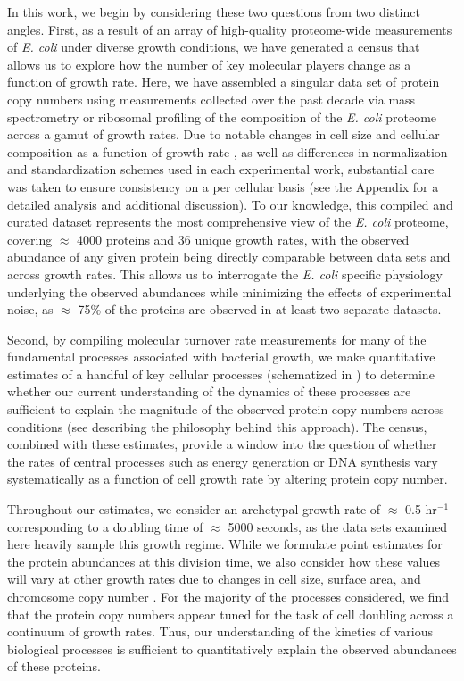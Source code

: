 In this work, we begin by considering these two questions from two distinct
angles. First, as a result of an array of high-quality proteome-wide
measurements of \textit{E. coli} under diverse growth conditions, we have
generated a census that allows us to explore how the number of key molecular
players change as a function of growth rate. Here, we have assembled a
singular data set of protein copy numbers using measurements collected over
the past decade via mass spectrometry \citep{schmidt2016, peebo2015,
valgepea2013} or ribosomal profiling \citep{li2014} of the composition of the
\textit{E. coli} proteome across a gamut of growth rates. Due to notable
changes in cell size and cellular composition as a function of growth rate
\citep{bremer2008, taheriaraghi2015}, as well as differences in normalization
and standardization schemes used in each experimental work, substantial care
was taken to ensure consistency on a per cellular basis (see the Appendix for
a detailed analysis and additional discussion). To our knowledge, this
compiled and curated dataset represents the most comprehensive view of the
\textit{E. coli} proteome, covering $\approx$ 4000 proteins and 36 unique
growth rates, with the observed abundance of any given protein being directly
comparable between data sets and across growth rates. This allows us to interrogate 
the \textit{E. coli} specific physiology underlying the observed abundances while 
minimizing the effects of experimental noise, as 
$\approx$ 75\% of the  proteins are observed in at least two separate datasets.


Second, by compiling molecular turnover rate measurements for many of the
fundamental processes associated with bacterial growth, we make quantitative
estimates of a handful of key cellular processes (schematized in
) to determine whether our current understanding of the
dynamics of these processes are sufficient to explain the magnitude of the
observed protein copy numbers across conditions (see 
describing the philosophy behind this approach). The census, combined with
these estimates, provide a window into the question of whether the rates of
central processes such as energy generation or DNA synthesis vary
systematically as a function of cell growth rate by altering protein copy
number.

Throughout our estimates, we consider an archetypal growth rate of $\approx$
0.5 hr$^{-1}$ corresponding to a doubling time of $\approx$ 5000 seconds, as
the data sets examined here heavily sample this growth regime. While we
formulate point estimates for the protein abundances at this division time,
we also consider how these values will vary at other growth rates due to
changes in cell size, surface area, and chromosome copy number
\citep{taheriaraghi2015, harris2018}. For the majority of the processes
considered, we find that the protein copy numbers appear tuned for the task
of cell doubling across a continuum of growth rates. Thus, our understanding
of the kinetics of various biological processes is sufficient to
quantitatively explain the observed abundances of these proteins.

